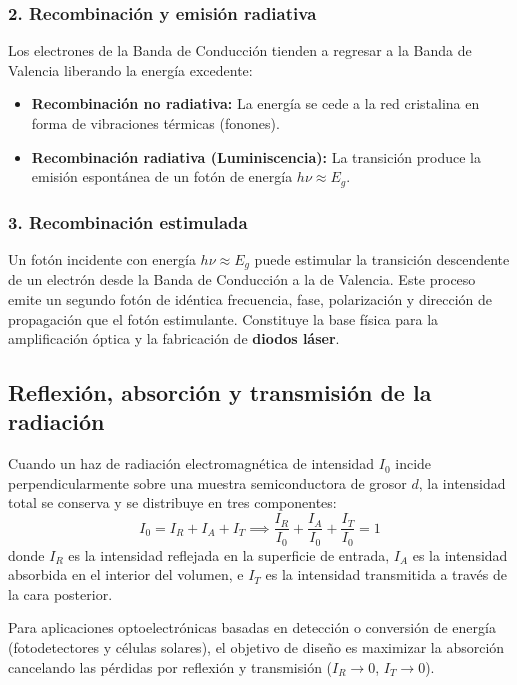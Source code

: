 \subsubsection{2. Recombinación y emisión radiativa}
Los electrones de la Banda de Conducción tienden a regresar a la Banda de Valencia liberando la energía excedente:
\begin{itemize}
    \item \textbf{Recombinación no radiativa:} La energía se cede a la red cristalina en forma de vibraciones térmicas (fonones).
    \item \textbf{Recombinación radiativa (Luminiscencia):} La transición produce la emisión espontánea de un fotón de energía $h\nu \approx E_g$.
\end{itemize}

\subsubsection{3. Recombinación estimulada}
Un fotón incidente con energía $h\nu \approx E_g$ puede estimular la transición descendente de un electrón desde la Banda de Conducción a la de Valencia. Este proceso emite un segundo fotón de idéntica frecuencia, fase, polarización y dirección de propagación que el fotón estimulante. Constituye la base física para la amplificación óptica y la fabricación de \textbf{diodos láser}.

\newpage
\subsection{Reflexión, absorción y transmisión de la radiación}

Cuando un haz de radiación electromagnética de intensidad $I_0$ incide perpendicularmente sobre una muestra semiconductora de grosor $d$, la intensidad total se conserva y se distribuye en tres componentes:
\[
I_0 = I_R + I_A + I_T \implies \frac{I_R}{I_0} + \frac{I_A}{I_0} + \frac{I_T}{I_0} = 1
\]
donde $I_R$ es la intensidad reflejada en la superficie de entrada, $I_A$ es la intensidad absorbida en el interior del volumen, e $I_T$ es la intensidad transmitida a través de la cara posterior.

Para aplicaciones optoelectrónicas basadas en detección o conversión de energía (fotodetectores y células solares), el objetivo de diseño es maximizar la absorción cancelando las pérdidas por reflexión y transmisión ($I_R \to 0$, $I_T \to 0$).

